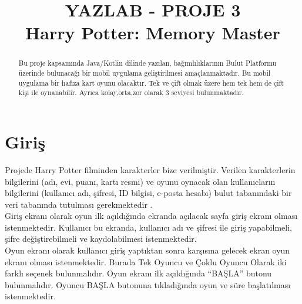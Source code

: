 \documentclass[conference]{IEEEtran}
\begin{document}
\title{YAZLAB - PROJE 3\\ Harry Potter: Memory Master
\\

}

\author{
\and
{}
}
\maketitle

\begin{abstract}
Bu proje kapsamında Java/Kotlin dilinde yazılan, bağımlılıklarının Bulut Platformu üzerinde bulunacağı bir mobil uygulama geliştirilmesi amaçlanmaktadır. Bu mobil uygulama bir hafıza kart oyunu olacaktır. Tek ve çift olmak üzere hem tek hem de çift kişi ile oynanabilir. Ayrıca kolay,orta,zor olarak 3 seviyesi bulunmaktadır. 
\\
\end{abstract}

\section{Giriş}

Projede Harry Potter filminden karakterler bize verilmiştir. Verilen karakterlerin bilgilerini (adı, evi, puanı, kartı resmi) ve oyunu oynacak olan kullanıcların bilgilerini (kullanıcı adı, şifresi, ID bilgisi, e-posta hesabı) bulut tabanındaki bir veri tabanında tutulması gerekmektedir . \\

Giriş ekranı olarak oyun ilk açıldığında ekranda açılacak sayfa giriş ekranı olması istenmektedir. Kullanıcı bu ekranda, kullanıcı adı ve şifresi ile giriş yapabilmeli, şifre değiştirebilmeli ve kaydolabilmesi istenmektedir.\\

Oyun ekranı olarak kullanıcı giriş yaptıktan sonra karşısına gelecek ekran oyun ekranı olması istenmektedir. Burada Tek Oyuncu ve Çoklu Oyuncu Olarak iki farklı seçenek bulunmalıdır. Oyun ekranı ilk açıldığında “BAŞLA” butonu bulunmalıdır. Oyuncu BAŞLA butonuna tıkladığında oyun ve süre başlatılması istenmektedir.\\
\end{document}
